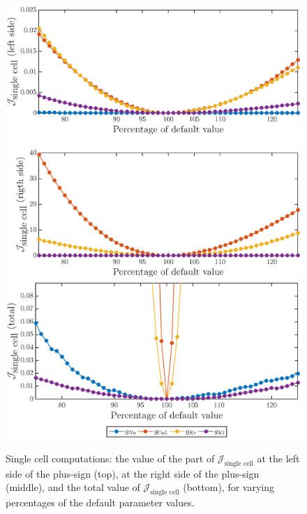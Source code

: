 \documentclass{article}
\begin{document}
\begin{figure}
\includegraphics[trim=0cm 0cm 0cm 1cm, clip=true, width=1\linewidth]{sc_functional_values} 
\includegraphics[trim=0cm 1cm 0cm 1cm, clip=true, width=1\linewidth]{sc_functional_values2} 
    \caption{Single cell computations: the value of the part of $\mathcal{J}_{\text{single cell}}$ at the left side of the plus-sign (top), at the right side of the plus-sign (middle), and the total value of $\mathcal{J}_{\text{single cell}}$ (bottom), for varying percentages of the default parameter values.}
    \label{fig:8}
\end{figure} 
%
\end{document}
